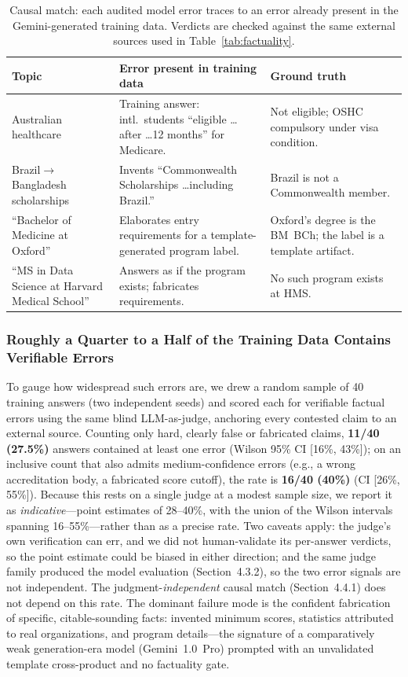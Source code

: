 \documentclass[11pt, a4paper]{article}
\begin{document}
\begin{table}[H]
\centering
\caption{Causal match: each audited model error traces to an error already present in the Gemini-generated training data. Verdicts are checked against the same external sources used in Table~\ref{tab:factuality}.}
\label{tab:dataset-causal}
\begin{tabular}{p{2.4cm}p{5.0cm}p{4.4cm}}
\hline
\textbf{Topic} & \textbf{Error present in training data} & \textbf{Ground truth} \\
\hline
Australian healthcare & Training answer: intl.\ students ``eligible \ldots after \ldots 12 months'' for Medicare. & Not eligible; OSHC compulsory under visa condition. \\
Brazil$\rightarrow$Bangladesh scholarships & Invents ``Commonwealth Scholarships \ldots including Brazil.'' & Brazil is not a Commonwealth member. \\
``Bachelor of Medicine at Oxford'' & Elaborates entry requirements for a template-generated program label. & Oxford's degree is the BM~BCh; the label is a template artifact. \\
``MS in Data Science at Harvard Medical School'' & Answers as if the program exists; fabricates requirements. & No such program exists at HMS. \\
\hline
\end{tabular}
\end{table}

\subsubsection{Roughly a Quarter to a Half of the Training Data Contains Verifiable Errors}
To gauge how widespread such errors are, we drew a random sample of 40 training answers (two independent seeds) and scored each for verifiable factual errors using the same blind LLM-as-judge, anchoring every contested claim to an external source. Counting only hard, clearly false or fabricated claims, \textbf{11/40 (27.5\%)} answers contained at least one error (Wilson 95\% CI [16\%, 43\%]); on an inclusive count that also admits medium-confidence errors (e.g., a wrong accreditation body, a fabricated score cutoff), the rate is \textbf{16/40 (40\%)} (CI [26\%, 55\%]). Because this rests on a single judge at a modest sample size, we report it as \emph{indicative}---point estimates of 28--40\%, with the union of the Wilson intervals spanning 16--55\%---rather than as a precise rate. Two caveats apply: the judge's own verification can err, and we did not human-validate its per-answer verdicts, so the point estimate could be biased in either direction; and the same judge family produced the model evaluation (Section~4.3.2), so the two error signals are not independent. The judgment-\emph{independent} causal match (Section~4.4.1) does not depend on this rate. The dominant failure mode is the confident fabrication of specific, citable-sounding facts: invented minimum scores, statistics attributed to real organizations, and program details---the signature of a comparatively weak generation-era model (Gemini~1.0~Pro) prompted with an unvalidated template cross-product and no factuality gate.
\end{document}
